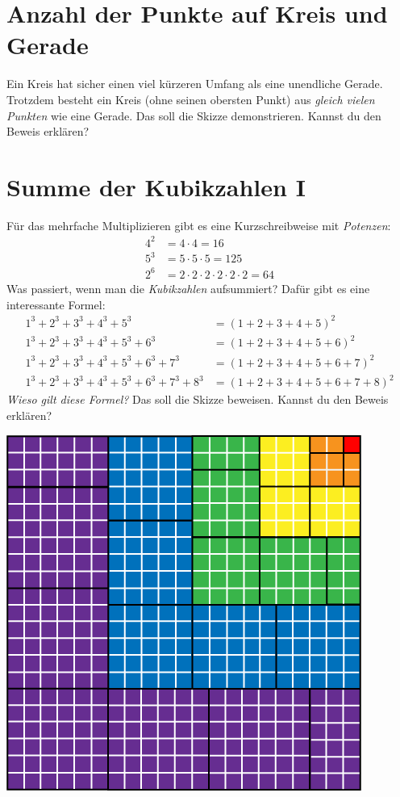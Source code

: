 \documentclass{../zirkelblatt}
\begin{document}
\vfill
\section*{Anzahl der Punkte auf Kreis und Gerade}
Ein Kreis hat sicher einen viel kürzeren Umfang als eine unendliche Gerade.
Trotzdem besteht ein Kreis (ohne seinen obersten Punkt) aus \emph{gleich vielen
Punkten} wie eine Gerade. Das soll die Skizze demonstrieren. Kannst du den
Beweis erklären?
\begin{center}

\end{center}


\vfill
\section*{Summe der Kubikzahlen I}
Für das mehrfache Multiplizieren gibt es eine Kurzschreibweise mit \emph{Potenzen}:
\begin{align*}
  4^2 &= 4 \cdot 4 = 16 \\
  5^3 &= 5 \cdot 5 \cdot 5 = 125 \\
  2^6 &= 2 \cdot 2 \cdot 2 \cdot 2 \cdot 2 \cdot 2 = 64
\end{align*}
Was passiert, wenn man die \emph{Kubikzahlen} aufsummiert? Dafür gibt es
eine interessante Formel:
\begin{align*}
  1^3 + 2^3 + 3^3 + 4^3 + 5^3 \phantom{{} + 6^3 + 7^3 + 8^3} &= (1 + 2 + 3 + 4 + 5)^2 \\
  1^3 + 2^3 + 3^3 + 4^3 + 5^3 + 6^3 \phantom{{} + 7^3 + 8^3} &= (1 + 2 + 3 + 4 + 5 + 6)^2 \\
  1^3 + 2^3 + 3^3 + 4^3 + 5^3 + 6^3 + 7^3 \phantom{{} + 8^3} &= (1 + 2 + 3 + 4 + 5 + 6 + 7)^2 \\
  1^3 + 2^3 + 3^3 + 4^3 + 5^3 + 6^3 + 7^3 + 8^3 &= (1 + 2 + 3 + 4 + 5 + 6 + 7 + 8)^2
\end{align*}
\emph{Wieso gilt diese Formel?} Das soll die Skizze beweisen. Kannst du den
Beweis erklären?
\begin{center}
\includegraphics[scale=0.7]{kubikzahlen-1}
\end{center}
\end{document}
